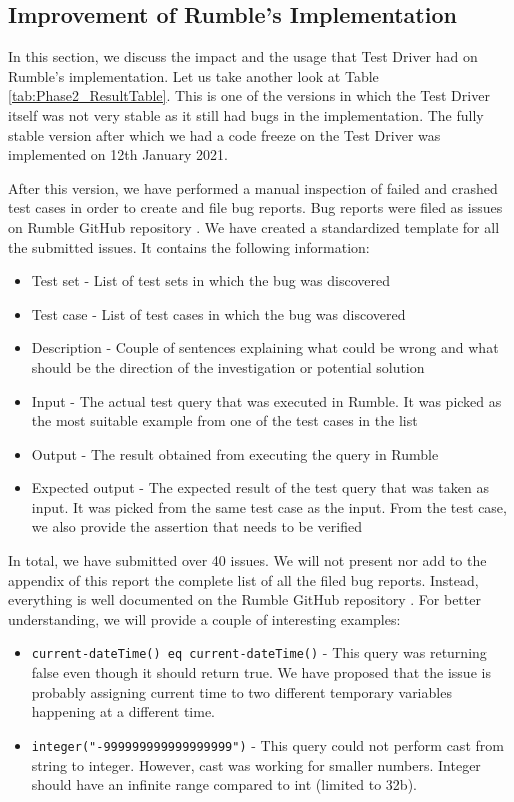 \subsection{Improvement of Rumble's Implementation}
In this section, we discuss the impact and the usage that Test Driver had on Rumble's implementation. Let us take another look at Table \ref{tab:Phase2_ResultTable}. This is one of the versions in which the Test Driver itself was not very stable as it still had bugs in the implementation. The fully stable version after which we had a code freeze on the Test Driver was implemented on 12th January 2021. 

After this version, we have performed a manual inspection of failed and crashed test cases in order to create and file bug reports. Bug reports were filed as issues on Rumble GitHub repository \cite{RumbleRepository}. We have created a standardized template for all the submitted issues. It contains the following information:
\begin{itemize}
	\item Test set - List of test sets in which the bug was discovered
	\item Test case - List of test cases in which the bug was discovered
	\item Description - Couple of sentences explaining what could be wrong and what should be the direction of the investigation or potential solution
	\item Input - The actual test query that was executed in Rumble. It was picked as the most suitable example from one of the test cases in the list
	\item Output - The result obtained from executing the query in Rumble
	\item Expected output - The expected result of the test query that was taken as input. It was picked from the same test case as the input. From the test case, we also provide the assertion that needs to be verified
\end{itemize}

In total, we have submitted over 40 issues. We will not present nor add to the appendix of this report the complete list of all the filed bug reports. Instead, everything is well documented on the Rumble GitHub repository \cite{IssuesSubmitted}. For better understanding, we will provide a couple of interesting examples:
\begin{itemize}
	\item \texttt{current-dateTime() eq current-dateTime()} - This query was returning false even though it should return true. We have proposed that the issue is probably assigning current time to two different temporary variables happening at a different time.
	\item \texttt{integer("-999999999999999999")} - This query could not perform cast from string to integer. However, cast was working for smaller numbers. Integer should have an infinite range compared to int (limited to 32b).
\end{itemize}

